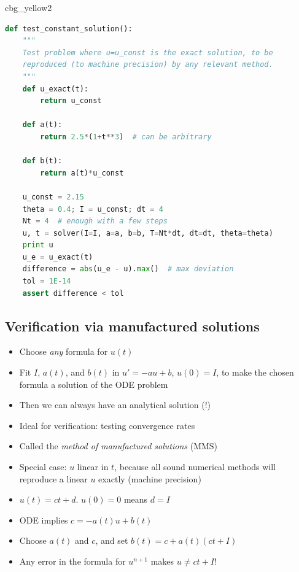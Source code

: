 \documentclass[%
oneside,                 %
final,                   %
10pt]{article}
\newenvironment{_cod_tight}[1]{
   \def\FrameCommand{\colorbox{#1}}
   \FrameRule0.6pt\MakeFramed {\FrameRestore}\vskip3mm}
   {\vskip0mm\endMakeFramed}
\newenvironment{cod}[1]{
\bgroup\rmfamily
\fboxsep=0mm\relax
\begin{_cod_tight}{#1}
\list{}{\parsep=-2mm\parskip=0mm\topsep=0pt\leftmargin=2mm
\rightmargin=2\leftmargin\leftmargin=4pt\relax}
\item\relax}
{\endlist\end{_cod_tight}\egroup}
\begin{document}
\begin{cod}{cbg_yellow2}\begin{lstlisting}[language=Python,style=simple,xleftmargin=2mm]
def test_constant_solution():
    """
    Test problem where u=u_const is the exact solution, to be
    reproduced (to machine precision) by any relevant method.
    """
    def u_exact(t):
        return u_const

    def a(t):
        return 2.5*(1+t**3)  # can be arbitrary

    def b(t):
        return a(t)*u_const

    u_const = 2.15
    theta = 0.4; I = u_const; dt = 4
    Nt = 4  # enough with a few steps
    u, t = solver(I=I, a=a, b=b, T=Nt*dt, dt=dt, theta=theta)
    print u
    u_e = u_exact(t)
    difference = abs(u_e - u).max()  # max deviation
    tol = 1E-14
    assert difference < tol
\end{lstlisting}\end{cod}
\noindent


\subsection*{Verification via manufactured solutions}
\label{decay:MMS}


\begin{itemize}
 \item Choose \emph{any} formula for $u(t)$

 \item Fit $I$, $a(t)$, and $b(t)$ in $u'=-au+b$, $u(0)=I$,
   to make the chosen formula a solution of the ODE problem

 \item Then we can always have an analytical solution (!)

 \item Ideal for verification: testing convergence rates

 \item Called the \emph{method of manufactured solutions} (MMS)

 \item Special case: $u$ linear in $t$, because all sound numerical
   methods will reproduce a linear $u$ exactly (machine precision)

 \item $u(t) = ct + d$. $u(0)=0$ means $d=I$

 \item ODE implies $c = -a(t)u + b(t)$

 \item Choose $a(t)$ and $c$, and set $b(t) = c + a(t)(ct + I)$

 \item Any error in the formula for $u^{n+1}$ makes $u\neq ct+I$!
\end{itemize}
\end{document}
